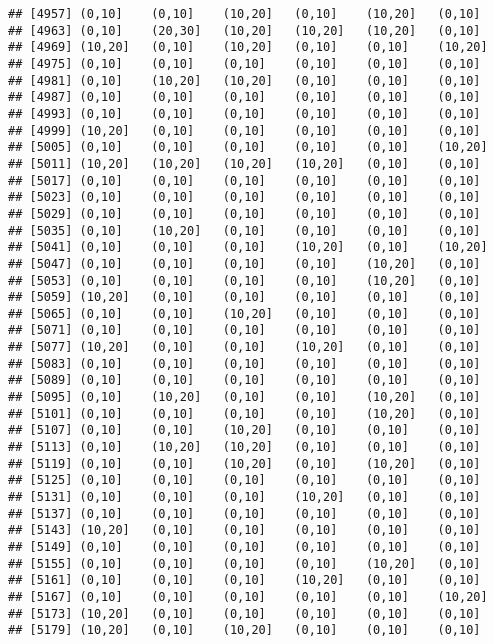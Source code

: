 \documentclass[]{article}
\begin{document}
\begin{verbatim}
## [4957] (0,10]    (0,10]    (10,20]   (0,10]    (10,20]   (0,10]   
## [4963] (0,10]    (20,30]   (10,20]   (10,20]   (10,20]   (0,10]   
## [4969] (10,20]   (0,10]    (10,20]   (0,10]    (0,10]    (10,20]  
## [4975] (0,10]    (0,10]    (0,10]    (0,10]    (0,10]    (0,10]   
## [4981] (0,10]    (10,20]   (10,20]   (0,10]    (0,10]    (0,10]   
## [4987] (0,10]    (0,10]    (0,10]    (0,10]    (0,10]    (0,10]   
## [4993] (0,10]    (0,10]    (0,10]    (0,10]    (0,10]    (0,10]   
## [4999] (10,20]   (0,10]    (0,10]    (0,10]    (0,10]    (0,10]   
## [5005] (0,10]    (0,10]    (0,10]    (0,10]    (0,10]    (10,20]  
## [5011] (10,20]   (10,20]   (10,20]   (10,20]   (0,10]    (0,10]   
## [5017] (0,10]    (0,10]    (0,10]    (0,10]    (0,10]    (0,10]   
## [5023] (0,10]    (0,10]    (0,10]    (0,10]    (0,10]    (0,10]   
## [5029] (0,10]    (0,10]    (0,10]    (0,10]    (0,10]    (0,10]   
## [5035] (0,10]    (10,20]   (0,10]    (0,10]    (0,10]    (0,10]   
## [5041] (0,10]    (0,10]    (0,10]    (10,20]   (0,10]    (10,20]  
## [5047] (0,10]    (0,10]    (0,10]    (0,10]    (10,20]   (0,10]   
## [5053] (0,10]    (0,10]    (0,10]    (0,10]    (10,20]   (0,10]   
## [5059] (10,20]   (0,10]    (0,10]    (0,10]    (0,10]    (0,10]   
## [5065] (0,10]    (0,10]    (10,20]   (0,10]    (0,10]    (0,10]   
## [5071] (0,10]    (0,10]    (0,10]    (0,10]    (0,10]    (0,10]   
## [5077] (10,20]   (0,10]    (0,10]    (10,20]   (0,10]    (0,10]   
## [5083] (0,10]    (0,10]    (0,10]    (0,10]    (0,10]    (0,10]   
## [5089] (0,10]    (0,10]    (0,10]    (0,10]    (0,10]    (0,10]   
## [5095] (0,10]    (10,20]   (0,10]    (0,10]    (10,20]   (0,10]   
## [5101] (0,10]    (0,10]    (0,10]    (0,10]    (10,20]   (0,10]   
## [5107] (0,10]    (0,10]    (10,20]   (0,10]    (0,10]    (0,10]   
## [5113] (0,10]    (10,20]   (10,20]   (0,10]    (0,10]    (0,10]   
## [5119] (0,10]    (0,10]    (10,20]   (0,10]    (10,20]   (0,10]   
## [5125] (0,10]    (0,10]    (0,10]    (0,10]    (0,10]    (0,10]   
## [5131] (0,10]    (0,10]    (0,10]    (10,20]   (0,10]    (0,10]   
## [5137] (0,10]    (0,10]    (0,10]    (0,10]    (0,10]    (0,10]   
## [5143] (10,20]   (0,10]    (0,10]    (0,10]    (0,10]    (0,10]   
## [5149] (0,10]    (0,10]    (0,10]    (0,10]    (0,10]    (0,10]   
## [5155] (0,10]    (0,10]    (0,10]    (0,10]    (10,20]   (0,10]   
## [5161] (0,10]    (0,10]    (0,10]    (10,20]   (0,10]    (0,10]   
## [5167] (0,10]    (0,10]    (0,10]    (0,10]    (0,10]    (10,20]  
## [5173] (10,20]   (0,10]    (0,10]    (0,10]    (0,10]    (0,10]   
## [5179] (10,20]   (0,10]    (10,20]   (0,10]    (0,10]    (0,10]   

\end{verbatim}
\end{document}
